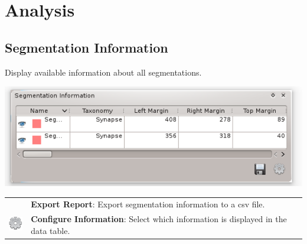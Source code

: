 \section{Analysis}

\subsection{Segmentation Information}

Display available information about all segmentations.

\begin{center}
\includegraphics{fig/SegmentationInformation}
\end{center}
\vspace{0.3cm}

\begin{tabular}{m{0.8cm} m{13cm}}
 &
\textbf{Export Report}: Export segmentation information to a csv file.\\
\includegraphics[width=0.7cm]{../../frontend/rsc/settings} &
\textbf{Configure Information}: Select which information is displayed in the data table.\\
\end{tabular}
